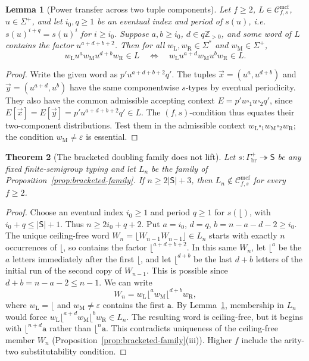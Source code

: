 \documentclass[11pt]{article}
\numberwithin{equation}{section}
\theoremstyle{plain}
\newtheorem{theorem}{Theorem}[section]
\newtheorem{lemma}[theorem]{Lemma}
\theoremstyle{definition}
\theoremstyle{remark}
\newcommand{\Cmcf}[2]{\mathcal{C}^{\mathrm{mcf}}_{#1,#2}}
\newcommand{\tuple}[1]{\vec{#1}}
\newcommand{\blank}{\square}
\newcommand{\eps}{\varepsilon}
\begin{document}
\begin{lemma}[Power transfer across two tuple components]
\label{lem:power-transfer}
Let $f\ge2$, $L\in\Cmcf{f}{s}$, $u\in\Sigma^+$, and let
$i_0,q\ge1$ be an eventual index and period of $s(u)$, i.e.\
$s(u)^{i+q}=s(u)^i$ for $i\ge i_0$. Suppose
$a,b\ge i_0$, $d\in q\mathbb Z_{>0}$, and some word of $L$
contains the factor $u^{a+d+b+2}$. Then for all
$w_{\mathrm L},w_{\mathrm R}\in\Sigma^*$ and $w_{\mathrm M}\in\Sigma^+$,
\[
 w_{\mathrm L}u^aw_{\mathrm M}u^{d+b}w_{\mathrm R}\in L\quad\Longleftrightarrow\quad
 w_{\mathrm L}u^{a+d}w_{\mathrm M}u^bw_{\mathrm R}\in L.
\]
\end{lemma}
\begin{proof}
Write the given word as $p'u^{a+d+b+2}q'$.
The tuples $\tuple x=(u^a,u^{d+b})$ and
$\tuple y=(u^{a+d},u^b)$ have the same componentwise $s$-types
by eventual periodicity. They also have the common admissible
accepting context $E=p'u\blank_1u\blank_2q'$, since
$E[\tuple x]=E[\tuple y]=p'u^{a+d+b+2}q'\in L$.
The $(f,s)$-condition thus equates their two-component distributions.
Test them in the admissible context $w_{\mathrm L}\blank_1w_{\mathrm M}\blank_2w_{\mathrm R}$;
the condition $w_{\mathrm M}\ne\eps$ is essential.
\end{proof}

\begin{theorem}[The bracketed doubling family does not lift]
\label{thm:doubling-no-lift}
Let $s:\Gamma_{\mathrm{br}}^+\twoheadrightarrow\mathsf S$
be any fixed finite-semigroup typing and let $L_n$ be the
family of Proposition~\ref{prop:bracketed-family}. If
$n\ge2|\mathsf S|+3$, then
$L_n\notin\Cmcf{f}{s}$ for every $f\ge2$.
\end{theorem}
\begin{proof}
Choose an eventual index $i_0\ge1$ and period $q\ge1$
for $s(\lfloor)$, with
$i_0+q\le|\mathsf S|+1$. Thus
$n\ge2i_0+q+2$. Put
$a=i_0$, $d=q$, $b=n-a-d-2\ge i_0$.
The unique ceiling-free word
$W_n=\lfloor W_{n-1}W_{n-1}\rfloor\in L_n$
starts with exactly $n$ occurrences of $\lfloor$,
so contains the factor $\lfloor^{a+d+b+2}$.
In this same $W_n$, let $\lfloor^a$ be the $a$ letters
immediately after the first $\lfloor$, and let
$\lfloor^{d+b}$ be the last $d+b$ letters of the
initial run of the second copy of $W_{n-1}$. This is possible
since $d+b=n-a-2\le n-1$. We can write
\[
 W_n=w_{\mathrm L}\lfloor^a w_{\mathrm M}\lfloor^{d+b}w_{\mathrm R},
\]
where $w_{\mathrm L}=\lfloor$ and $w_{\mathrm M}\ne\eps$ contains the first
$\mathtt a$. By Lemma~\ref{lem:power-transfer}, membership
in $L_n$ would force
$w_{\mathrm L}\lfloor^{a+d}w_{\mathrm M}\lfloor^bw_{\mathrm R}\in L_n$.
The resulting word is ceiling-free, but it begins with
$\lfloor^{n+d}\mathtt a$ rather than
$\lfloor^n\mathtt a$. This contradicts uniqueness
of the ceiling-free member $W_n$
(Proposition~\ref{prop:bracketed-family}(iii)).
Higher $f$ include the arity-two substitutability condition.
\end{proof}
\end{document}
